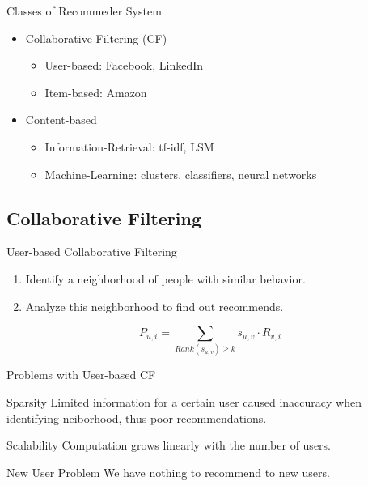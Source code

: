 \documentclass{beamer}
\begin{document}
\begin{frame}[fragile]{Classes of Recommeder System}
	\begin{itemize}
        \item Collaborative Filtering (CF)
        \begin{itemize}
        \item User-based: Facebook, LinkedIn
        \item Item-based: Amazon
        \end{itemize}

        \item Content-based
        \begin{itemize}
        \item Information-Retrieval: tf-idf, LSM
        \item Machine-Learning: clusters, classifiers, neural networks
        \end{itemize}
	\end{itemize}
\end{frame}

\subsection{Collaborative Filtering}

\begin{frame}[fragile]{User-based Collaborative Filtering}

\begin{enumerate}
\item Identify a neighborhood of people with similar behavior.
\item Analyze this neighborhood to find out recommends.
\end{enumerate}

\begin{equation}
P_{u,i} = \sum_{Rank(s_{u,v})\geq k}s_{u,v} \cdot R_{v,i}
\end{equation}

\end{frame}

\begin{frame}[fragile]{Problems with User-based CF}

\begin{block}{Sparsity}
        Limited information for a certain user caused inaccuracy when identifying neiborhood, thus poor recommendations.
        \end{block}
\begin{block}{Scalability}
        Computation grows linearly with the number of users.
        \end{block}

\begin{block}{New User Problem}
        We have nothing to recommend to new users.
        \end{block}

\end{frame}
\end{document}
